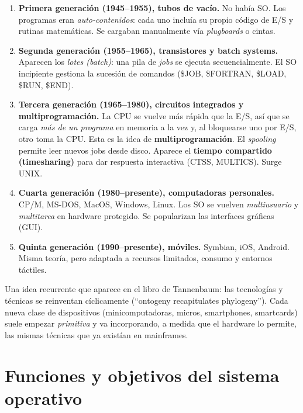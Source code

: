 \documentclass[11pt,a4paper]{article}
\begin{document}
\begin{enumerate}[leftmargin=*]
    \item \textbf{Primera generación (1945--1955), tubos de vacío.}
        No había SO. Los programas eran \emph{auto-contenidos}: cada
        uno incluía su propio código de E/S y rutinas matemáticas. Se
        cargaban manualmente vía \emph{plugboards} o cintas.
    \item \textbf{Segunda generación (1955--1965), transistores y batch
        systems.} Aparecen los \emph{lotes (batch)}: una pila de
        \emph{jobs} se ejecuta secuencialmente. El SO incipiente
        gestiona la sucesión de comandos
        (\$JOB, \$FORTRAN, \$LOAD, \$RUN, \$END).
    \item \textbf{Tercera generación (1965--1980), circuitos integrados
        y multiprogramación.} La CPU se vuelve más rápida que la E/S, así
        que se carga \emph{más de un programa} en memoria a la vez y, al
        bloquearse uno por E/S, otro toma la CPU. Esta es la idea de
        \textbf{multiprogramación}. El \emph{spooling} permite leer
        nuevos jobs desde disco. Aparece el \textbf{tiempo compartido
        (timesharing)} para dar respuesta interactiva
        (CTSS, MULTICS). Surge UNIX.
    \item \textbf{Cuarta generación (1980--presente), computadoras
        personales.} CP/M, MS-DOS, MacOS, Windows, Linux. Los SO se
        vuelven \emph{multiusuario} y \emph{multitarea} en hardware
        protegido. Se popularizan las interfaces gráficas (GUI).
    \item \textbf{Quinta generación (1990--presente), móviles.} Symbian,
        iOS, Android. Misma teoría, pero adaptada a recursos limitados,
        consumo y entornos táctiles.
\end{enumerate}

Una idea recurrente que aparece en el libro de Tannenbaum: las
tecnologías y técnicas se reinventan cíclicamente (``ontogeny
recapitulates phylogeny''). Cada nueva clase de dispositivos
(minicomputadoras, micros, smartphones, smartcards) suele empezar
\emph{primitiva} y va incorporando, a medida que el hardware lo
permite, las mismas técnicas que ya existían en mainframes.

\section{Funciones y objetivos del sistema operativo}
\end{document}

